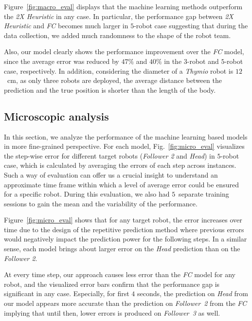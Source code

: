 \documentclass[letterpaper, 10 pt, conference]{ieeeconf}  %
\begin{document}
	Figure~\ref{fig:macro_eval} displays that the machine learning methods outperform 
	the \emph{2X Heuristic} in any case. In particular, the performance gap between 
	\emph{2X Heuristic} and \emph{FC} becomes much larger in $5$-robot case suggesting that
	during the data collection, we added much randomness to the shape of the robot team.  
	
	Also, our model clearly shows the performance improvement over the \emph{FC} model, since 
	the average error was reduced by $47\%$ and $40\%$ in the $3$-robot and $5$-robot case, 
	respectively. In addition, considering the diameter of a \emph{Thymio} robot is 
	$12$~cm, as only three robots are deployed, the average distance between the prediction 
	and the true position is shorter than the length of the body. 

	
	\subsection{Microscopic analysis}
	\label{sec:microscopic_analysis}
	
	In this section, we analyze the performance of the machine learning based models 
	in more fine-grained perspective. For each model, Fig.~\ref{fig:micro_eval} visualizes the 
	step-wise error for different target robots (\emph{Follower 2} and \emph{Head}) 
	in $5$-robot case, which is calculated by averaging the errors of each step across instances. 
	Such a way of evaluation can offer us a crucial insight to understand an approximate time frame 
	within which a level of average error could be ensured for a specific robot. During this 
	evaluation, we also had $5$~separate training sessions to gain the mean and the variability 
	of the performance. 
	
	Figure~\ref{fig:micro_eval} shows that for any target robot, the error increases over time due to the 
	design of the repetitive prediction method where previous errors would negatively 
	impact the prediction power for the following steps. In a similar sense, each model 
	brings about larger error on the \emph{Head} prediction than on the \emph{Follower 2}. 
	
	At every time step, our approach causes less error than the \emph{FC} model for any robot, and  
    the visualized error bars confirm that the performance gap is significant in any case.  
    Especially, for first $4$ seconds, the prediction on \emph{Head} from our model appears 
    more accurate than the prediction on \emph{Follower~2} from the \emph{FC} implying that 
    until then, lower errors is produced on \emph{Follower~3} as well. 
\end{document}
